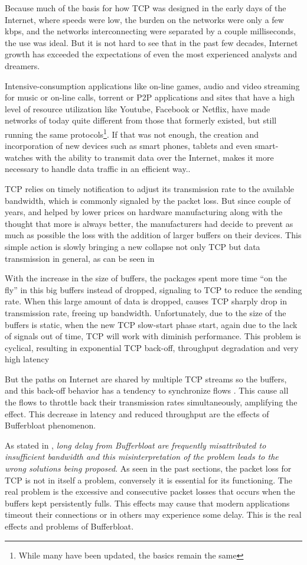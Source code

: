 Because much of the basis for how TCP was designed in the early days of the
Internet, where speeds were low, the burden on the networks were only a few
kbps, and the networks interconnecting were separated by a couple
milliseconds, the use was ideal. But it is not hard to see that in the past
few decades, Internet growth has exceeded the expectations of even the most
experienced analysts and dreamers.

Intensive-consumption applications like on-line games, audio and video
streaming for music or on-line calls, torrent or P2P applications and 
sites that have a high level of resource utilization like Youtube, Facebook or
Netflix, have made networks of today quite different from those that formerly
existed, but still running the same protocols\footnote{While many have been
updated, the basics remain the same}. If that was not enough, the creation and
incorporation of new devices such as smart phones, tablets and even smart-watches
with the ability to transmit data over the Internet, makes it more necessary to handle data traffic in an efficient way..

TCP relies on timely notification to adjust its transmission rate to the
available bandwidth, which is commonly signaled by the packet loss. But since
couple of years, and helped by lower prices on hardware manufacturing along
with the thought that more is always better, the manufacturers had decide to
prevent as much as possible the loss with the addition of larger buffers on
their devices. This simple action is slowly bringing a new collapse not only
TCP but data transmission in general, as can be seen in \cite{CACMStaff}

With the increase in the size of buffers, the packages spent more time
``on the fly'' in this big buffers instead of dropped, signaling to TCP to
reduce the sending rate. When this large amount of data is dropped, causes TCP
sharply drop in transmission rate, freeing up bandwidth. Unfortunately, due to
the size of the buffers is static, when the new TCP slow-start phase start,
again due to the lack of signals out of time, TCP will work with diminish
performance. This problem is cyclical, resulting in exponential TCP back-off,
throughput degradation and very high latency

But the paths on Internet are shared by multiple TCP streams so the buffers,
and this back-off behavior has a tendency to synchronize flows
\cite{main:ref:1}. This cause all the flows to throttle back their
transmission rates simultaneously, amplifying the effect. This decrease in
latency and reduced throughput are the effects of Bufferbloat phenomenon.

As stated in \cite{GettysNichols}, \textit{long delay from Bufferbloat are
frequently misattributed to insufficient bandwidth and this misinterpretation
of the problem leads to the wrong solutions being proposed}. As seen in the
past sections, the packet loss for TCP is not in itself a problem, conversely
it is essential for its functioning. The real problem is  the excessive and
consecutive packet losses that occurs when the buffers kept persistently
fulls. This effects may cause that modern applications timeout their
connections or in others may experience some delay. This is the real
effects and problems of Bufferbloat.

